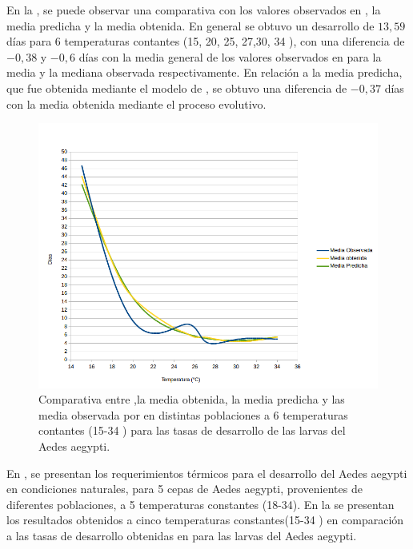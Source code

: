 En la , se puede observar una comparativa con los valores
observados en \cite{rueda1990temperature}, la media predicha y la media obtenida. En general se
obtuvo un desarrollo de $13,59$ días para 6 temperaturas contantes (15, 20, 25, 27,30, 34
\textcelsius), con una diferencia de $-0,38$ y $-0,6$ días con la media general de los valores
observados en \cite{rueda1990temperature} para la media y la mediana observada respectivamente. En
relación a la media predicha, que fue obtenida mediante el modelo de \cite{sharpe1977reaction}, se
obtuvo una diferencia de $-0,37$ días con la media obtenida mediante el proceso evolutivo.


\begin{figure}[!htbp]
    \centering
    \includegraphics[width=1\textwidth]{capitulo-6/graphics/desarrollo-larva-rueda.png}
    \caption{\label{fig:desarrollo-larva-rueda1990}
    Comparativa entre ,la media obtenida, la media predicha y las media observada por \cite{
    rueda1990temperature} en distintas poblaciones a 6 temperaturas contantes (15-34 \textcelsius)
    para las tasas de desarrollo de las larvas del Aedes aegypti.}
\end{figure}


En \cite{BESERRA2006}, se presentan los requerimientos térmicos para el desarrollo del Aedes
aegypti en condiciones naturales, para 5 cepas de Aedes aegypti, provenientes de diferentes
poblaciones, a 5 temperaturas constantes (18-34\textcelsius). En la
 se presentan los resultados obtenidos a cinco
temperaturas constantes(15-34 \textcelsius) en comparación a las tasas de desarrollo obtenidas en
\cite{BESERRA2006} para las larvas del Aedes aegypti.

